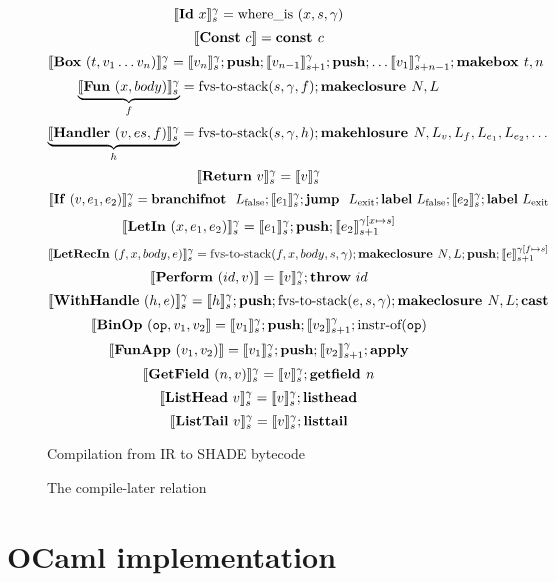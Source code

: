 \documentclass[class=article, crop=false]{standalone}
\begin{document}
\begin{figure}
    $$ \llbracket \mathbf{Id}\ x \rrbracket_s^\gamma = \text{where\_is}\ (x, s, \gamma) $$
    $$ \llbracket \mathbf{Const}\ c \rrbracket = \textbf{const } c $$
    $$ \llbracket \mathbf{Box}\ (t, v_1 \dots v_n) \rrbracket_s ^ \gamma = \llbracket v_n \rrbracket_s^\gamma; \textbf{push}; \llbracket v_{n-1} \rrbracket_{s+1}^\gamma; \textbf{push}; \dots \llbracket v_1 \rrbracket_{s+n-1}^\gamma; \textbf{makebox }t, n $$
    $$ \underbrace{\llbracket \mathbf{Fun}\ (x, body) \rrbracket_s ^\gamma }_f = \text{fvs-to-stack} (s, \gamma, f); \textbf{makeclosure }N, L $$
    $$ \underbrace{\llbracket \mathbf{Handler}\ (v, es, f) \rrbracket_s^\gamma}_h = \text{fvs-to-stack} (s, \gamma, h); \textbf{makehlosure }N, L_v, L_f, L_{e_1}, L_{e_2}, \dots $$
    $$ \llbracket \mathbf{Return}\ v \rrbracket_s ^ \gamma =  \llbracket v \rrbracket_s ^ \gamma $$
    $$ \llbracket \mathbf{If}\ (v, e_1, e_2) \rrbracket_s ^ \gamma = \textbf{branchifnot }\ L_\text{false}; \llbracket e_1 \rrbracket_s^\gamma; \textbf{jump }\ L_\text{exit}; \textbf{label}\ L_\text{false}; \llbracket e_2 \rrbracket_s^\gamma; \textbf{label}\ L_\text{exit} $$
    $$ \llbracket \mathbf{LetIn}\ (x, e_1, e_2) \rrbracket_s^\gamma = \llbracket e_1 \rrbracket_s^\gamma; \textbf{push}; \llbracket e_2 \rrbracket_{s+1}^{\gamma[x \mapsto s]} $$
    $$ \llbracket \mathbf{LetRecIn}\ (f, x, body, e) \rrbracket_s^\gamma = \text{fvs-to-stack}(f, x, body, s, \gamma); \textbf{makeclosure }N, L; \textbf{push}; \llbracket e \rrbracket_{s+1}^{\gamma[f \mapsto s]} $$
    $$ \llbracket \mathbf{Perform}\ (id, v) \rrbracket = \llbracket v \rrbracket_s ^ \gamma; \textbf{throw}\ id $$
    $$ \llbracket \mathbf{WithHandle}\ (h, e) \rrbracket_s ^ \gamma = \llbracket h \rrbracket_s ^ \gamma; \textbf{push}; \text{fvs-to-stack}(e, s, \gamma); \textbf{makeclosure }N, L; \mathbf{cast} $$
    $$ \llbracket \mathbf{BinOp}\ (\mathtt{op}, v_1, v_2 \rrbracket = \llbracket v_1 \rrbracket_s ^ \gamma; \textbf{push}; \llbracket v_2 \rrbracket_{s+1}^\gamma; \text{instr-of}(\mathtt{op}) $$
    $$ \llbracket \mathbf{FunApp}\ (v_1, v_2) \rrbracket = \llbracket v_1 \rrbracket_s ^ \gamma; \textbf{push}; \llbracket v_2 \rrbracket_{s+1} ^ \gamma; \textbf{apply} $$
    $$ \llbracket \mathbf{GetField}\ (n, v) \rrbracket_s ^ \gamma = \llbracket v \rrbracket_s ^ \gamma; \textbf{getfield }n $$
    $$ \llbracket \mathbf{ListHead}\ v \rrbracket_s ^ \gamma = \llbracket v \rrbracket_s ^ \gamma; \textbf{listhead} $$
    $$ \llbracket \mathbf{ListTail}\ v \rrbracket_s ^ \gamma = \llbracket v \rrbracket_s ^ \gamma ; \textbf{listtail} $$

    \caption{Compilation from IR to SHADE bytecode}
    \label{fig:compilation}
\end{figure}

\begin{figure}


    \caption{The compile-later relation}
    \label{compile-later}
\end{figure}


\section{OCaml implementation}
\end{document}
